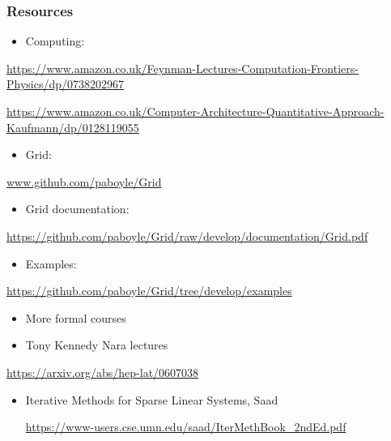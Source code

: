 \documentclass[pdf,ps,8pt]{beamer}
\newcommand{\textapprox}{\raisebox{0.5ex}{\texttildelow}}
\newcommand{\link}[1]{\href{#1}{ {\color{blue} #1} }}
\begin{document}
\begin{frame}[fragile]\small\frametitle{ Resources  }

  \begin{itemize} \item Computing: \end{itemize}
  \begin{center}\link{https://www.amazon.co.uk/Feynman-Lectures-Computation-Frontiers-Physics/dp/0738202967}\end{center} 
  \begin{center}\link{https://www.amazon.co.uk/Computer-Architecture-Quantitative-Approach-Kaufmann/dp/0128119055}\end{center} 
  \begin{itemize} \item Grid: \end{itemize}
  \begin{center}\link{www.github.com/paboyle/Grid}\end{center} 
  \begin{itemize} \item Grid documentation: \end{itemize}
  \begin{center}\link{https://github.com/paboyle/Grid/raw/develop/documentation/Grid.pdf}\end{center}
  \begin{itemize} \item Examples: \end{itemize}
  \begin{center}\link{https://github.com/paboyle/Grid/tree/develop/examples}\end{center}
  \begin{itemize} \item More formal courses\end{itemize}
  \begin{itemize}\item Tony Kennedy Nara lectures\end{itemize}
  \begin{center}\link{https://arxiv.org/abs/hep-lat/0607038}\end{center}
  \begin{itemize}
  \item Iterative Methods for Sparse Linear Systems, Saad
  \begin{center}
  \href{https://www-users.cse.umn.edu/~saad/IterMethBook_2ndEd.pdf}{https://www-users.cse.umn.edu/\textapprox saad/IterMethBook\_2ndEd.pdf}
  \end{center}
    \end{itemize}
\end{frame}
\end{document}
